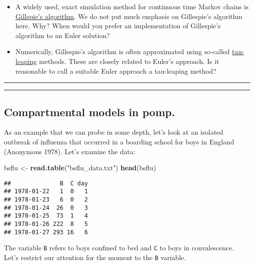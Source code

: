 \documentclass[]{article}
\newenvironment{Shaded}{\begin{snugshade}}{\end{snugshade}}
\newcommand{\KeywordTok}[1]{\textcolor[rgb]{0.13,0.29,0.53}{\textbf{#1}}}
\newcommand{\StringTok}[1]{\textcolor[rgb]{0.31,0.60,0.02}{#1}}
\newcommand{\NormalTok}[1]{#1}
\begin{document}
\begin{itemize}
\item
  A widely used, exact simulation method for continuous time Markov
  chains is
  \href{https://en.wikipedia.org/wiki/Gillespie_algorithm}{Gillspie's
  algorithm}. We do not put much emphasis on Gillespie's algorithm here.
  Why? When would you prefer an implementation of Gillespie's algorithm
  to an Euler solution?
\item
  Numerically, Gillespie's algorithm is often approximated using
  so-called
  \href{https://en.wikipedia.org/wiki/Tau-leaping}{tau-leaping} methods.
  These are closely related to Euler's approach. Is it reasonable to
  call a suitable Euler approach a tau-leaping method?
\end{itemize}

\begin{center}\rule{0.5\linewidth}{\linethickness}\end{center}

\begin{center}\rule{0.5\linewidth}{\linethickness}\end{center}

\subsection{\texorpdfstring{Compartmental models in
\textbf{pomp}.}{Compartmental models in pomp.}}\label{compartmental-models-in-pomp.}

As an example that we can probe in some depth, let's look at an isolated
outbreak of influenza that occurred in a boarding school for boys in
England (Anonymous 1978). Let's examine the data:

\begin{Shaded}
\begin{Highlighting}[]
\NormalTok{bsflu <-}\StringTok{ }\KeywordTok{read.table}\NormalTok{(}\StringTok{"bsflu_data.txt"}\NormalTok{)}
\KeywordTok{head}\NormalTok{(bsflu)}
\end{Highlighting}
\end{Shaded}

\begin{verbatim}
##              B  C day
## 1978-01-22   1  0   1
## 1978-01-23   6  0   2
## 1978-01-24  26  0   3
## 1978-01-25  73  1   4
## 1978-01-26 222  8   5
## 1978-01-27 293 16   6
\end{verbatim}

The variable \texttt{B} refers to boys confined to bed and \texttt{C} to
boys in convalescence. Let's restrict our attention for the moment to
the \texttt{B} variable.
\end{document}

